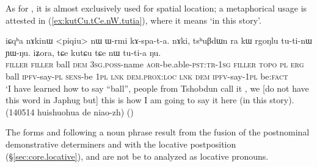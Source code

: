 As for , it is almost exclusively used for spatial location; a metaphorical usage is attested in (\ref{ex:kutCu.tCe.nW.tutia}), where it means `in this story'.

\begin{exe}
\ex \label{ex:kutCu.tCe.nW.tutia}
\gll iɕqʰa nɤkinɯ <piqiu> nɯ ɯ-rmi kɤ-spa-t-a. nɤki, tsʰuβdɯn ra kɯ rgoŋlu tu-ti-nɯ ɲɯ-ŋu. iʑora, tɕe kutɕu tɕe nɯ tu-ti-a ŋu. \\
\textsc{filler} \textsc{filler} ball \textsc{dem} \textsc{3sg}.\textsc{poss}-name \textsc{aor}-be.able-\textsc{pst}:\textsc{tr}-\textsc{1sg} \textsc{filler}  \textsc{topo} \textsc{pl} \textsc{erg} ball \textsc{ipfv}-say-\textsc{pl} \textsc{sens}-be \textsc{1pl} \textsc{lnk} \textsc{dem}.\textsc{prox}:\textsc{loc} \textsc{lnk} \textsc{dem} \textsc{ipfv}-say-\textsc{1pl} be:\textsc{fact} \\
\glt `I have learned how to say ``ball'', people from Tshobdun call it , we [do not have this word in Japhug but] this is how I am going to say it here (in this story). (140514 huishuohua de niao-zh)
()
\end{exe}

The forms  and  following a noun phrase result from the fusion of the postnominal demonstrative determiners  and  with the locative postposition  (§\ref{sec:core.locative}), and are not be to analyzed as locative pronouns.

